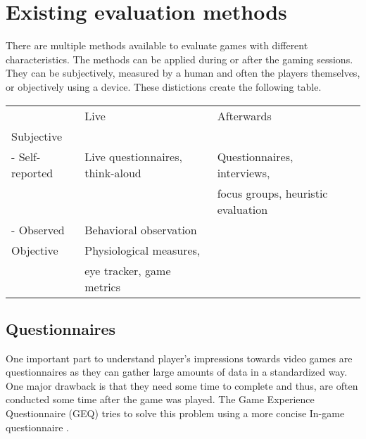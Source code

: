 \chapter{Existing evaluation methods}
\label{ch:evaluationmethods}


There are multiple methods available to evaluate games with different characteristics. The methods can be applied during or after the gaming sessions. They can be subjectively, measured by a human and often the players themselves, or objectively using a device. These distictions create the following table.
 
\begin{table}[]
	\begin{tabular}{llll}
					& Live                                              & Afterwards\\
	Subjective      &                                                   & \\
	- Self-reported & Live questionnaires, think-aloud                  & Questionnaires, interviews,\\ 
					& 													& focus groups, heuristic evaluation \\
	- Observed      & Behavioral observation 							& \\
	Objective       & Physiological measures, 							& \\  
					& eye tracker, game metrics         				&\\                                                    
	\end{tabular}
\end{table}                                             								


\section{Questionnaires}
One important part to understand player's impressions towards video games are questionnaires as they can gather large amounts of data in a standardized way. One major drawback is that they need some time to complete and thus, are often conducted some time after the game was played. The Game Experience Questionnaire (GEQ) tries to solve this problem using a more concise In-game questionnaire \cite{poels2007game}. 

